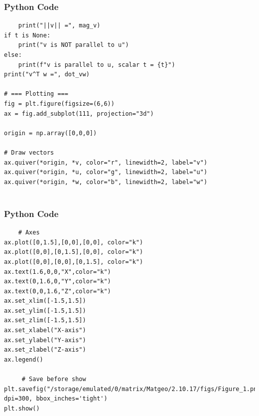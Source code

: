 \documentclass{beamer}
\begin{document}
\begin{frame}[fragile]
    \frametitle{Python Code}
    \begin{lstlisting}
    print("||v|| =", mag_v)
if t is None:
    print("v is NOT parallel to u")
else:
    print(f"v is parallel to u, scalar t = {t}")
print("v^T w =", dot_vw)

# === Plotting ===
fig = plt.figure(figsize=(6,6))
ax = fig.add_subplot(111, projection="3d")

origin = np.array([0,0,0])

# Draw vectors
ax.quiver(*origin, *v, color="r", linewidth=2, label="v")
ax.quiver(*origin, *u, color="g", linewidth=2, label="u")
ax.quiver(*origin, *w, color="b", linewidth=2, label="w")


    \end{lstlisting}
        
\end{frame}

\begin{frame}[fragile]
    \frametitle{Python Code}
    \begin{lstlisting}
    # Axes
ax.plot([0,1.5],[0,0],[0,0], color="k")
ax.plot([0,0],[0,1.5],[0,0], color="k")
ax.plot([0,0],[0,0],[0,1.5], color="k")
ax.text(1.6,0,0,"X",color="k")
ax.text(0,1.6,0,"Y",color="k")
ax.text(0,0,1.6,"Z",color="k")
ax.set_xlim([-1.5,1.5])
ax.set_ylim([-1.5,1.5])
ax.set_zlim([-1.5,1.5])
ax.set_xlabel("X-axis")
ax.set_ylabel("Y-axis")
ax.set_zlabel("Z-axis")
ax.legend()

     # Save before show
plt.savefig("/storage/emulated/0/matrix/Matgeo/2.10.17/figs/Figure_1.png", dpi=300, bbox_inches='tight')
plt.show()   
    \end{lstlisting}
\end{frame}
\end{document}
